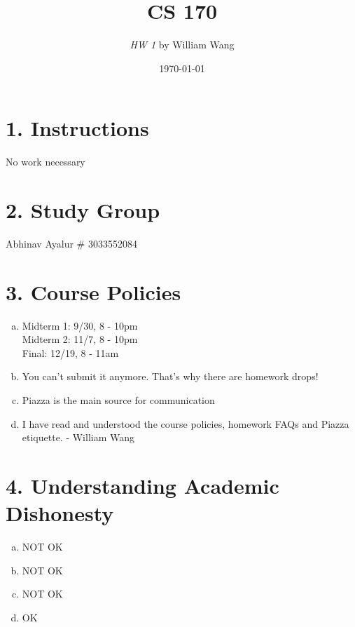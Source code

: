 \documentclass[a4paper]{article}
\title{\textbf{CS 170}}
\author{\textit{HW 1} by William Wang}
\date{\today}
\newcommand{\<}{\langle}
\renewcommand{\>}{\rangle}
\renewcommand{\^}{\wedge}
\begin{document}
\maketitle
\newpage
\section{1. Instructions}
No work necessary
\newpage
\section{2. Study Group}
Abhinav Ayalur \# 3033552084 
\newpage
\section{3. Course Policies}
\begin{enumerate}[a)]
    \item Midterm 1: 9/30, 8 - 10pm\\
    Midterm 2: 11/7, 8 - 10pm\\
    Final: 12/19, 8 - 11am
    \item You can't submit it anymore. That's why there are homework drops!
    \item Piazza is the main source for communication
    \item I have read and understood the course policies, homework FAQs and Piazza etiquette. - William Wang
\end{enumerate}
\newpage
\section{4. Understanding Academic Dishonesty}
\begin{enumerate}[a)]
    \item NOT OK
    \item NOT OK
    \item NOT OK
    \item OK
\end{enumerate}
\newpage
\end{document}
